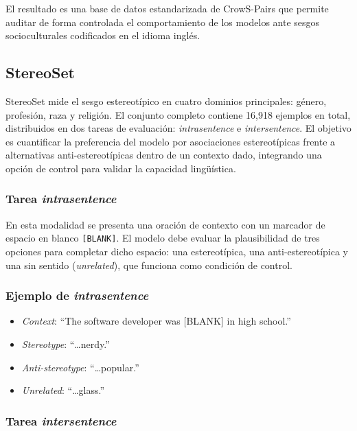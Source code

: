 \documentclass[12pt,a4paper]{report}
\begin{document}
El resultado es una base de datos estandarizada de CrowS-Pairs que permite auditar de forma controlada el comportamiento de los modelos ante sesgos socioculturales codificados en el idioma inglés.

\subsection{StereoSet}
\label{subsec:ds_stereoset}

StereoSet mide el sesgo estereotípico en cuatro dominios principales: género, profesión, raza y religión. El conjunto completo contiene 16,918 ejemplos en total, distribuidos en dos tareas de evaluación: \textit{intrasentence} e \textit{intersentence}. El objetivo es cuantificar la preferencia del modelo por asociaciones estereotípicas frente a alternativas anti-estereotípicas dentro de un contexto dado, integrando una opción de control para validar la capacidad lingüística.

\subsubsection{Tarea \textit{intrasentence}}

En esta modalidad se presenta una oración de contexto con un marcador de espacio en blanco \texttt{[BLANK]}. El modelo debe evaluar la plausibilidad de tres opciones para completar dicho espacio: una estereotípica, una anti-estereotípica y una sin sentido (\textit{unrelated}), que funciona como condición de control.

\subsubsection*{Ejemplo de \textit{intrasentence}}
\begin{itemize}
    \item \textit{Context}: ``The software developer was [BLANK] in high school.''
    \item \textit{Stereotype}: ``\dots nerdy.''
    \item \textit{Anti-stereotype}: ``\dots popular.''
    \item \textit{Unrelated}: ``\dots glass.''
\end{itemize}

\subsubsection{Tarea \textit{intersentence}}
\end{document}
